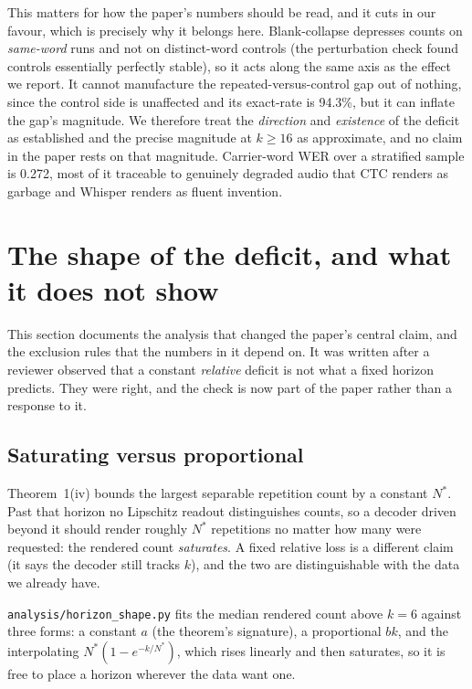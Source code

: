 \documentclass[11pt]{article}
\begin{document}
This matters for how the paper's numbers should be read, and it cuts in our
favour, which is precisely why it belongs here. Blank-collapse depresses counts
on \emph{same-word} runs and not on distinct-word controls (the perturbation
check found controls essentially perfectly stable), so it acts along the same
axis as the effect we report. It cannot manufacture the repeated-versus-control
gap out of nothing, since the control side is unaffected and its exact-rate is
94.3\%, but it can inflate the gap's magnitude. We therefore treat the
\emph{direction} and \emph{existence} of the deficit as established and the
precise magnitude at $k\ge16$ as approximate, and no claim in the paper rests on
that magnitude. Carrier-word WER over a stratified sample is 0.272, most of it
traceable to genuinely degraded audio that CTC renders as garbage and Whisper
renders as fluent invention.


\section{The shape of the deficit, and what it does not show}
\label{sec:s10}

This section documents the analysis that changed the paper's central claim, and
the exclusion rules that the numbers in it depend on. It was written after a
reviewer observed that a constant \emph{relative} deficit is not what a fixed
horizon predicts. They were right, and the check is now part of the paper rather
than a response to it.

\subsection{Saturating versus proportional}

Theorem~1(iv) bounds the largest separable repetition count by a constant
$N^\ast$. Past that horizon no Lipschitz readout distinguishes counts, so a
decoder driven beyond it should render roughly $N^\ast$ repetitions no matter how
many were requested: the rendered count \emph{saturates}. A fixed relative loss
is a different claim (it says the decoder still tracks $k$), and the two are
distinguishable with the data we already have.

\texttt{analysis/horizon\_shape.py} fits the median rendered count above
$k\!=\!6$ against three forms: a constant $a$ (the theorem's signature), a
proportional $bk$, and the interpolating
$N^\ast(1-e^{-k/N^\ast})$, which rises linearly and then saturates, so it is free
to place a horizon wherever the data want one.
\end{document}
